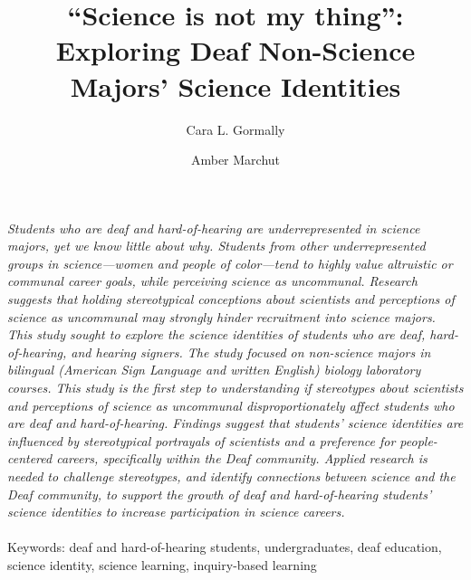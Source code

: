 \documentclass[11.5pt]{sig-alternate} %
\makeatletter
\let\oldabstract\abstract
\let\oldendabstract\endabstract
\renewenvironment{abstract} %
{\renewenvironment{quotation}%
               {\list{}{\addtolength{\leftmargin}{1em} %
                        \listparindent 1.5em%
                        \itemindent    \listparindent%
                        \rightmargin   \leftmargin%
                        \parsep        \z@ \@plus\p@}%
                \item\relax}%
               {\endlist}%
\oldabstract}
{\oldendabstract}
\makeatother
\begin{document}
\title{“Science is not my thing”: Exploring Deaf Non-Science Majors’ Science Identities}

\author[1]{\large \color{blue}Cara L. Gormally}
\author[2]{\large \color{blue}Amber Marchut}


\toappear{}
\maketitle
\begin{@twocolumnfalse} 
\begin{abstract}
\item 
\textit{Students who are deaf and hard-of-hearing are underrepresented in science majors, yet we know little about why. Students from other underrepresented groups in science—women and people of color—tend to highly value altruistic or communal career goals, while perceiving science as uncommunal. Research suggests that holding stereotypical conceptions about scientists and perceptions of science as uncommunal may strongly hinder recruitment into science majors. This study sought to explore the science identities of students who are deaf, hard-of-hearing, and hearing signers. The study focused on non-science majors in bilingual (American Sign Language and written English) biology laboratory courses. This study is the first step to understanding if stereotypes about scientists and perceptions of science as uncommunal disproportionately affect students who are deaf and hard-of-hearing. Findings suggest that students’ science identities are influenced by stereotypical portrayals of scientists and a preference for people-centered careers, specifically within the Deaf community. Applied research is needed to challenge stereotypes, and identify connections between science and the Deaf community, to support the growth of deaf and hard-of-hearing students’ science identities to increase participation in science careers.}
\\ \\
Keywords: deaf and hard-of-hearing students, undergraduates, deaf education, science identity, science learning, inquiry-based learning
\end{abstract}
\end{@twocolumnfalse}

\end{document}
